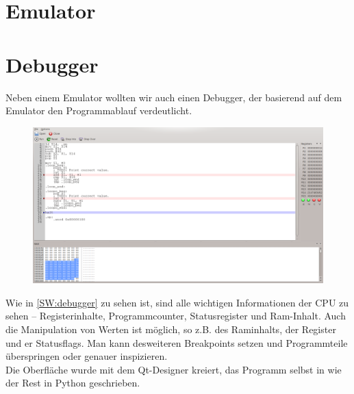 \section{Emulator} %

\section{Debugger}
Neben einem Emulator wollten wir auch einen Debugger, der basierend auf dem Emulator den Programmablauf verdeutlicht.
\begin{figure}[htb]
\centering
\includegraphics[width=\textwidth]{images/debugger.png}
\end{figure}
Wie in \autoref{SW:debugger} zu sehen ist, sind alle wichtigen Informationen der CPU zu sehen -- Registerinhalte, Programmcounter, Statusregister und Ram-Inhalt.
Auch die Manipulation von Werten ist möglich, so z.B. des Raminhalts, der Register und er Statusflags. Man kann desweiteren Breakpoints setzen und Programmteile überspringen oder genauer inspizieren.\\
Die Oberfläche wurde mit dem Qt-Designer kreiert, das Programm selbst in wie der Rest in Python geschrieben.
